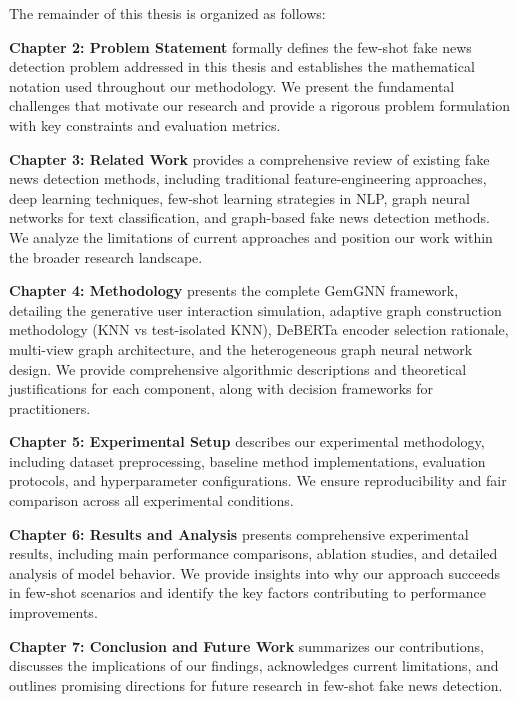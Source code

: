 The remainder of this thesis is organized as follows:

\textbf{Chapter 2: Problem Statement} formally defines the few-shot fake news detection problem addressed in this thesis and establishes the mathematical notation used throughout our methodology. We present the fundamental challenges that motivate our research and provide a rigorous problem formulation with key constraints and evaluation metrics.

\textbf{Chapter 3: Related Work} provides a comprehensive review of existing fake news detection methods, including traditional feature-engineering approaches, deep learning techniques, few-shot learning strategies in NLP, graph neural networks for text classification, and graph-based fake news detection methods. We analyze the limitations of current approaches and position our work within the broader research landscape.

\textbf{Chapter 4: Methodology} presents the complete GemGNN framework, detailing the generative user interaction simulation, adaptive graph construction methodology (KNN vs test-isolated KNN), DeBERTa encoder selection rationale, multi-view graph architecture, and the heterogeneous graph neural network design. We provide comprehensive algorithmic descriptions and theoretical justifications for each component, along with decision frameworks for practitioners.

\textbf{Chapter 5: Experimental Setup} describes our experimental methodology, including dataset preprocessing, baseline method implementations, evaluation protocols, and hyperparameter configurations. We ensure reproducibility and fair comparison across all experimental conditions.

\textbf{Chapter 6: Results and Analysis} presents comprehensive experimental results, including main performance comparisons, ablation studies, and detailed analysis of model behavior. We provide insights into why our approach succeeds in few-shot scenarios and identify the key factors contributing to performance improvements.

\textbf{Chapter 7: Conclusion and Future Work} summarizes our contributions, discusses the implications of our findings, acknowledges current limitations, and outlines promising directions for future research in few-shot fake news detection.

\EndChapter

